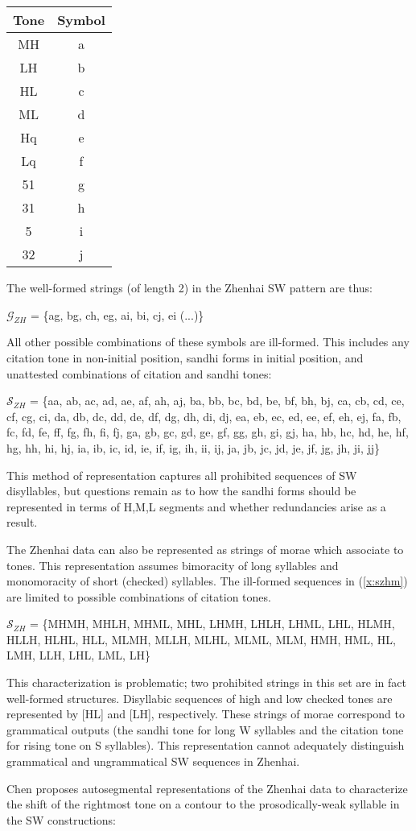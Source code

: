 \documentclass{article}
\begin{document}
\begin{exe}
\ex
\label{x:zhenhaiabst}
\begin{tabular}[t]{|c|c|}
\hline
Tone & Symbol\\
\hline
MH & a\\
LH & b\\
HL & c\\
ML & d\\
Hq & e\\
Lq & f\\
51 & g\\
31 & h\\
5 & i\\
32 & j\\
\hline
\end{tabular}
\end{exe}
The well-formed strings (of length 2) in the Zhenhai SW pattern are thus:
\begin{exe}
\ex
$\mathcal{G}_{ZH}$ = \{ag, bg, ch, eg, ai, bi, cj, ei (...)\}
\end{exe}
All other possible combinations of these symbols are ill-formed. This includes any citation tone in non-initial position, sandhi forms in initial position, and unattested combinations of citation and sandhi tones:
\begin{exe}
\ex
$\mathcal{S}_{ZH}$ = \{aa, ab, ac, ad, ae, af, ah, aj, ba, bb, bc, bd, be, bf, bh, bj, ca, cb, cd, ce, cf,
cg, ci, da, db, dc, dd, de, df, dg, dh, di, dj, ea, eb, ec, ed, ee, ef, eh, ej, fa, fb, fc, fd, fe, ff, fg,
fh, fi, fj, ga, gb, gc, gd, ge, gf, gg, gh, gi, gj, ha, hb, hc, hd, he, hf, hg, hh, hi, hj, ia, ib, ic, id, ie, if, ig, ih, ii, ij, ja, jb, jc, jd, je, jf, jg, jh, ji, jj\}
\end{exe}
This method of representation captures all prohibited sequences of SW disyllables, but questions remain as to how the sandhi forms should be represented in terms of H,M,L segments and whether redundancies arise as a result.  \par
The Zhenhai data can also be represented as strings of morae which associate to tones. This representation assumes bimoracity of long syllables and monomoracity of short (checked) syllables. The ill-formed sequences in (\ref{x:szhm}) are limited to possible combinations of citation tones.
\begin{exe}
\ex
\label{x:szhm}
$\mathcal{S}_{ZH}$ = \{MHMH, MHLH, MHML, MHL, LHMH, LHLH, LHML, LHL, HLMH, HLLH, HLHL, HLL, MLMH, MLLH, MLHL, MLML, MLM, HMH, HML, HL, LMH, LLH, LHL, LML, LH\} 
\end{exe}
This characterization is problematic; two prohibited strings in this set are in fact well-formed structures. Disyllabic sequences of high and low checked tones are represented by [HL] and [LH], respectively. These strings of morae correspond to grammatical outputs (the sandhi tone for long W syllables and the citation tone for rising tone on S syllables). This representation cannot adequately distinguish grammatical and ungrammatical SW sequences in Zhenhai. \par
Chen proposes autosegmental representations of the Zhenhai data to characterize the shift of the rightmost tone on a contour to the prosodically-weak syllable in the SW constructions:
\end{document}

